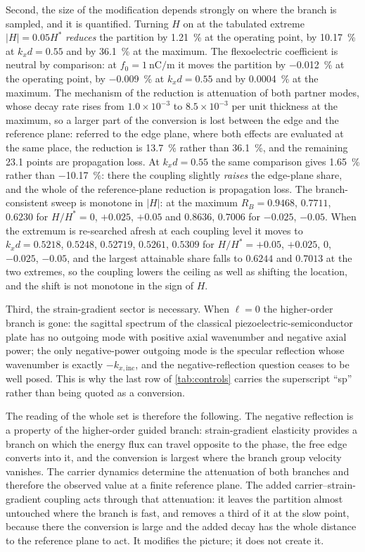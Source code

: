Second, the size of the modification depends strongly on where the branch is
sampled, and it is quantified.  Turning $H$ on at the tabulated extreme
$|H|=0.05H^{*}$ \emph{reduces} the partition by \SI{1.21}{\percent} at the
operating point, by \SI{10.17}{\percent} at $k_xd=0.55$ and by
\SI{36.1}{\percent} at the maximum.  The flexoelectric coefficient is
neutral by comparison: at $f_0=\SI{1}{\nano\coulomb\per\metre}$ it moves the
partition by \SI{-0.012}{\percent} at the operating point, by
\SI{-0.009}{\percent} at $k_xd=0.55$ and by \SI{0.0004}{\percent} at the
maximum.  The mechanism of the reduction is
attenuation of both partner modes, whose decay rate rises from
$1.0\times10^{-3}$ to $8.5\times10^{-3}$ per unit thickness at the maximum, so a
larger part of the conversion is lost between the edge and the reference plane:
referred to the edge plane, where both effects are evaluated at the same place,
the reduction is \SI{13.7}{\percent} rather than \SI{36.1}{\percent}, and the
remaining \SI{23.1}{} points are propagation loss.  At $k_xd=0.55$ the same
comparison gives \SI{1.65}{\percent} rather than \SI{-10.17}{\percent}: there the
coupling slightly \emph{raises} the edge-plane share, and the whole of the
reference-plane reduction is propagation loss.  The
branch-consistent sweep is monotone in $|H|$: at the maximum
$R_B=0.9468$, $0.7711$, $0.6230$ for $H/H^{*}=0$, $+0.025$, $+0.05$ and
$0.8636$, $0.7006$ for $-0.025$, $-0.05$.  When the extremum is re-searched
afresh at each coupling level it moves to $k_xd=0.5218$, $0.5248$, $0.52719$,
$0.5261$, $0.5309$ for $H/H^{*}=+0.05$, $+0.025$, $0$, $-0.025$, $-0.05$, and
the largest attainable share falls to $0.6244$ and $0.7013$ at the two extremes,
so the coupling lowers the ceiling as well as shifting the location, and the
shift is not monotone in the sign of $H$.

Third, the strain-gradient sector is necessary.  When $\ell=0$ the higher-order
branch is gone: the sagittal spectrum of the classical piezoelectric-semiconductor
plate has no outgoing mode with positive axial wavenumber and negative axial
power; the only negative-power outgoing mode is the specular reflection whose
wavenumber is exactly $-k_{x,\text{inc}}$, and the negative-reflection question
ceases to be well posed.  This is why the last row of \cref{tab:controls} carries
the superscript ``sp'' rather than being quoted as a conversion.

The reading of the whole set is therefore the following.  The negative
reflection is a property of the higher-order guided branch: strain-gradient
elasticity provides a branch on which the energy flux can travel opposite to the
phase, the free edge converts into it, and the conversion is largest where the
branch group velocity vanishes.  The carrier dynamics determine the attenuation
of both branches and therefore the observed value at a finite reference plane.
The added carrier--strain-gradient coupling acts through that attenuation: it
leaves the partition almost untouched where the branch is fast, and removes a
third of it at the slow point, because there the conversion is large and the
added decay has the whole distance to the reference plane to act.  It modifies
the picture; it does not create it.


